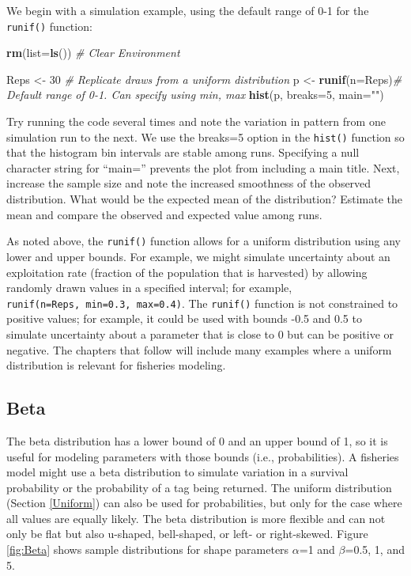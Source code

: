\documentclass[
]{krantz}
\makeatletter
\newenvironment{Shaded}{\begin{snugshade}}{\end{snugshade}}
\newcommand{\AttributeTok}[1]{\textcolor[rgb]{0.27,0.27,0.27}{#1}}
\newcommand{\CommentTok}[1]{\textcolor[rgb]{0.37,0.37,0.37}{\textit{#1}}}
\newcommand{\DecValTok}[1]{\textcolor[rgb]{0.06,0.06,0.06}{#1}}
\newcommand{\FunctionTok}[1]{\textcolor[rgb]{0.27,0.27,0.27}{\textbf{#1}}}
\newcommand{\NormalTok}[1]{#1}
\newcommand{\OtherTok}[1]{\textcolor[rgb]{0.37,0.37,0.37}{#1}}
\newcommand{\StringTok}[1]{\textcolor[rgb]{0.5,0.5,0.5}{#1}}
\newenvironment{kframe}{%
\medskip{}
\setlength{\fboxsep}{.8em}
 \def\at@end@of@kframe{}%
 \ifinner\ifhmode%
  \def\at@end@of@kframe{\end{minipage}}%
  \begin{minipage}{\columnwidth}%
 \fi\fi%
 \def\FrameCommand##1{\hskip\@totalleftmargin \hskip-\fboxsep
 \colorbox{shadecolor}{##1}\hskip-\fboxsep
     \hskip-\linewidth \hskip-\@totalleftmargin \hskip\columnwidth}%
 \MakeFramed {\advance\hsize-\width
   \@totalleftmargin\z@ \linewidth\hsize
   \@setminipage}}%
 {\par\unskip\endMakeFramed%
 \at@end@of@kframe}
\renewenvironment{Shaded}{\begin{kframe}}{\end{kframe}}
\makeatother
\begin{document}
We begin with a simulation example, using the default range of 0-1 for the \texttt{runif()} function:

\begin{Shaded}
\begin{Highlighting}[]
\FunctionTok{rm}\NormalTok{(}\AttributeTok{list=}\FunctionTok{ls}\NormalTok{()) }\CommentTok{\# Clear Environment}

\NormalTok{Reps }\OtherTok{\textless{}{-}} \DecValTok{30} \CommentTok{\# Replicate draws from a uniform distribution}
\NormalTok{p }\OtherTok{\textless{}{-}} \FunctionTok{runif}\NormalTok{(}\AttributeTok{n=}\NormalTok{Reps)}\CommentTok{\# Default range of 0{-}1. Can specify using min, max}
\FunctionTok{hist}\NormalTok{(p, }\AttributeTok{breaks=}\DecValTok{5}\NormalTok{, }\AttributeTok{main=}\StringTok{""}\NormalTok{)}
\end{Highlighting}
\end{Shaded}

Try running the code several times and note the variation in pattern from one simulation run to the next. We use the breaks=5 option in the \texttt{hist()} function so that the histogram bin intervals are stable among runs. Specifying a null character string for ``main='' prevents the plot from including a main title. Next, increase the sample size and note the increased smoothness of the observed distribution. What would be the expected mean of the distribution? Estimate the mean and compare the observed and expected value among runs.

As noted above, the \texttt{runif()} function allows for a uniform distribution using any lower and upper bounds. For example, we might simulate uncertainty about an exploitation rate (fraction of the population that is harvested) by allowing randomly drawn values in a specified interval; for example, \texttt{runif(n=Reps,\ min=0.3,\ max=0.4)}. The \texttt{runif()} function is not constrained to positive values; for example, it could be used with bounds -0.5 and 0.5 to simulate uncertainty about a parameter that is close to 0 but can be positive or negative. The chapters that follow will include many examples where a uniform distribution is relevant for fisheries modeling.

\hypertarget{beta}{%
\subsection{Beta}\label{beta}}

The beta distribution has a lower bound of 0 and an upper bound of 1, so it is useful for modeling parameters with those bounds (i.e., probabilities). A fisheries model might use a beta distribution to simulate variation in a survival probability or the probability of a tag being returned. The uniform distribution (Section \ref{Uniform}) can also be used for probabilities, but only for the case where all values are equally likely. The beta distribution is more flexible and can not only be flat but also u-shaped, bell-shaped, or left- or right-skewed. Figure \ref{fig:Beta} shows sample distributions for shape parameters \(\alpha\)=1 and \(\beta\)=0.5, 1, and 5.
\end{document}
